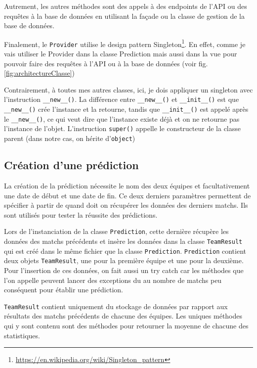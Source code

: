 \documentclass[a4paper,14pt]{extarticle}
\begin{document}
{Autrement, les autres méthodes sont des appels à des endpoints de l'API ou des requêtes à la base de données en utilisant la façade ou la classe de gestion de la base de données.

Finalement, le \texttt{Provider} utilise le design pattern Singleton\footnote{\url{https://en.wikipedia.org/wiki/Singleton_pattern}}. En effet, comme je vais utiliser le Provider dans la classe Prediction mais aussi dans la vue pour pouvoir faire des requêtes à l'API ou à la base de données (voir fig. \ref{fig:architectureClasse})


Contrairement, à toutes mes autres classes, ici, je dois appliquer un singleton avec l'instruction \texttt{\_\_new\_\_()}. La différence entre \texttt{\_\_new\_\_()} et \texttt{\_\_init\_\_()} est que \texttt{\_\_new\_\_()} crée l'instance et la retourne, tandis que \texttt{\_\_init\_\_()} est appelé après le \texttt{\_\_new\_\_()}, ce qui veut dire que l'instance existe déjà et on ne retourne pas l'instance de l'objet. L'instruction \texttt{super()} appelle le constructeur de la classe parent (dans notre cas, on hérite d'\texttt{object})

\subsection{Création d'une prédiction}

La création de la prédiction nécessite le nom des deux équipes et facultativement une date de début et une date de fin. Ce deux derniers paramètres permettent de spécifier à partir de quand doit on récupérer les données des derniers matchs. Ils sont utilisés pour tester la réussite des prédictions.


Lors de l'instanciation de la classe \texttt{Prediction}, cette dernière récupère les données des matchs précédents et insère les données dans la classe \texttt{TeamResult} qui est créé dans le même fichier que la classe \texttt{Prediction}. \texttt{Prediction} contient deux objets \texttt{TeamResult}, une pour la première équipe et une pour la deuxième. Pour l'insertion de ces données, on fait aussi un try catch car les méthodes que l'on appelle peuvent lancer des exceptions du au nombre de matchs peu conséquent pour établir une prédiction.

\texttt{TeamResult} contient uniquement du stockage de données par rapport aux résultats des matchs précédents de chacune des équipes. Les uniques méthodes qui y sont contenu sont des méthodes pour retourner la moyenne de chacune des statistiques.

}
\end{document}

